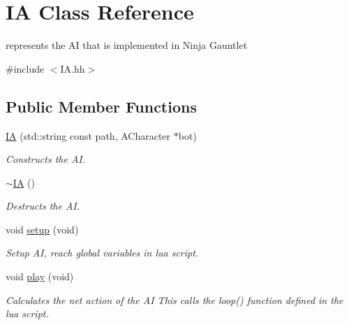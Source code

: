 \hypertarget{classIA}{}\section{IA Class Reference}
\label{classIA}


represents the AI that is implemented in Ninja Gauntlet  




{\ttfamily \#include $<$I\+A.\+hh$>$}

\subsection*{Public Member Functions}
\begin{DoxyCompactItemize}
\item 
\hyperlink{classIA_a0733aa0c9dd00b142f8b474fc3b0b714}{IA} (std\+::string const path, A\+Character $\ast$bot)
\begin{DoxyCompactList}\small\item\em Constructs the AI. \end{DoxyCompactList}\item 
\mbox{\label{classIA_a67d4dd285ae5169239348432bab9ad0e}} 
\hyperlink{classIA_a67d4dd285ae5169239348432bab9ad0e}{$\sim$\+IA} ()
\begin{DoxyCompactList}\small\item\em Destructs the AI. \end{DoxyCompactList}\item 
\mbox{\label{classIA_af500668744c1eaa6345db6d062e463fc}} 
void \hyperlink{classIA_af500668744c1eaa6345db6d062e463fc}{setup} (void)
\begin{DoxyCompactList}\small\item\em Setup AI, reach global variables in lua script. \end{DoxyCompactList}\item 
\mbox{\label{classIA_a9638e8dda4767df32fc06504eb257d65}} 
void \hyperlink{classIA_a9638e8dda4767df32fc06504eb257d65}{play} (void)
\begin{DoxyCompactList}\small\item\em Calculates the net action of the AI This calls the loop() function defined in the lua script. \end{DoxyCompactList}\end{DoxyCompactItemize}
